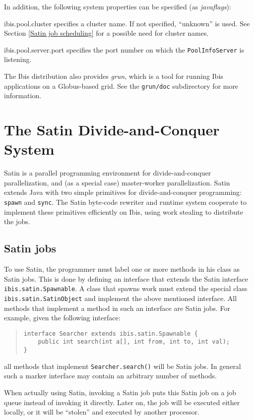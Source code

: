 \documentclass[10pt]{article}
\newcommand{\mysection}[1]{\section{#1}\label{#1}}
\newcommand{\mysubsection}[1]{\subsection{#1}\label{#1}}
\begin{document}
In addition, the following system properties can be specified
(as \emph{javaflags}):
\begin{description}
\item{ibis.pool.cluster}
specifies a cluster name. If not specified,
``unknown'' is used.
See Section \ref{Satin job scheduling} for a possible need for cluster
names.
\item{ibis.pool.server.port}
specifies the port number on which the
\texttt{PoolInfoServer} is listening.
\end{description}

The Ibis distribution also provides \emph{grun}, which is a tool for
running Ibis applications on a Globus-based grid. See the
\texttt{grun/doc} subdirectory for more information.

\mysection{The Satin Divide-and-Conquer System}

Satin is a parallel programming environment for divide-and-conquer
parallelization, and (as a special case) master-worker parallelization.
Satin extends Java with two simple primitives for
divide-and-conquer programming: \texttt{spawn} and \texttt{sync}.
The Satin byte-code rewriter and
runtime system cooperate to implement these primitives efficiently on
Ibis, using work stealing to distribute the jobs.

\mysubsection{Satin jobs}

To use Satin, the programmer must label one or more methods in his class
as Satin jobs. This is done by defining an interface that extends
the Satin interface \texttt{ibis.satin.Spawnable}.
A class that spawns work must extend the special class
\texttt{ibis.satin.SatinObject} and implement the above mentioned interface.
All methods that implement a method in such an
interface are Satin jobs. For example, given the following interface:

\begin{quote}
\begin{verbatim}
interface Searcher extends ibis.satin.Spawnable {
    public int search(int a[], int from, int to, int val);
}
\end{verbatim}
\end{quote}
\noindent
all methods that implement \texttt{Searcher.search()} will be Satin jobs.
In general such a marker interface may contain an arbitrary number
of methods.

When actually using Satin, invoking a Satin job puts this Satin job
on a job queue instead of invoking it directly.
Later on, the job will be executed either locally, or it will be
``stolen'' and executed by another processor.
\end{document}
